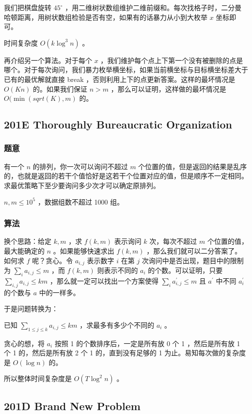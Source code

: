 \documentclass[11pt]{article}
\begin{document}
我们把棋盘旋转 $45^\circ$ ，用二维树状数组维护二维前缀和。每次找格子时，二分曼哈顿距离，用树状数组检验是否有空，如果有的话暴力从小到大枚举 $x$ 坐标即可。

时间复杂度 $O(k \log^3 n)$ 。

再介绍另一个算法。对于每个 $x$ ，我们维护每个点上下第一个没有被删除的点是哪个。对于每次询问，我们暴力枚举横坐标，如果当前横坐标与目标横坐标差大于已有的最优解就直接 break ，否则利用上下的点更新答案。这样的最坏情况是 $O(Kn)$ 的。如果我们保证 $n > m$ ，那么可以证明，这样做的最坏情况是 $O(\min(sqrt(K), m)$ 的。
\subsection{201E  Thoroughly Bureaucratic Organization}
\label{sec-11-6}
\subsubsection{题意}
\label{sec-11-6-1}

    有一个 $n$ 的排列，你一次可以询问不超过 $m$ 个位置的值，但是返回的结果是乱序的，也就是返回的若干个值恰好是这若干个位置对应的值，但是顺序不一定相同。求最优策略下至少要询问多少次才可以确定原排列。

    $n, m \leq 10^5$ ，数据组数不超过 1000 组。
\subsubsection{算法}
\label{sec-11-6-2}

    换个思路：给定 $k, m$ ，求 $f(k, m)$ 表示询问 $k$ 次，每次不超过 $m$ 个位置的值，最大能确定的 $n$ 。如果能够快速求出 $f(k, m)$ ，那么我们就可以二分答案了。如何求 $f$ 呢？贪心。令 $a_{i, j}$ 表示数字 $i$ 在第 $j$ 次询问中是否出现，题目中的限制为 $\sum_{i} a_{i, j} \leq m$ ，而 $f (k, m)$ 则表示不同的 $a_i$ 的个数。可以证明，只要 $\sum_{i, j} a_{i, j} \leq km$ ，那么就一定可以找出一个方案使得 $\sum_{i} a^\prime_{i, j} \leq m$ 且 $a^\prime$ 中不同 $a^\prime_i$ 的个数与 $a$ 中的一样多。

    于是问题转换为：
\begin{problem}
  已知 $\sum_{1 \leq j \leq k} a_{i, j} \leq km$ ，求最多有多少个不同的 $a_i$ 。
\end{problem}
    贪心的想，将 $a_i$ 按照 1 的个数排序后，一定是所有放 0 个 1 ，然后是所有放 1 个 1 的，然后是所有放 2 个 1 的，直到没有足够的 1 为止。易知每次做的复杂度是 $O(\log n)$ 的。

    所以整体时间复杂度是 $O(T \log^2 n)$ 。
\subsection{201D  Brand New Problem}
\label{sec-11-7}
\end{document}

